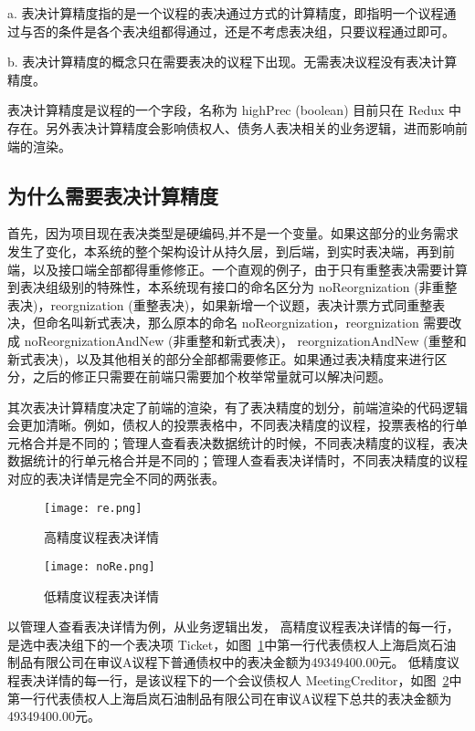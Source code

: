   \quad{}a. 表决计算精度指的是一个议程的表决通过方式的计算精度，即指明一个议程通过与否的条件是各个表决组都得通过，还是不考虑表决组，只要议程通过即可。


  \quad{}b. 表决计算精度的概念只在需要表决的议程下出现。无需表决议程没有表决计算精度。

  表决计算精度是议程的一个字段，名称为 highPrec (boolean) 目前只在 Redux 中存在。另外表决计算精度会影响债权人、债务人表决相关的业务逻辑，进而影响前端的渲染。

  \subsection{为什么需要表决计算精度}

  首先，因为项目现在表决类型是硬编码,并不是一个变量。如果这部分的业务需求发生了变化，本系统的整个架构设计从持久层，到后端，到实时表决端，再到前端，以及接口端全部都得重修修正。一个直观的例子，由于只有重整表决需要计算到表决组级别的特殊性，本系统现有接口的命名区分为 noReorgnization (非重整表决)，reorgnization (重整表决)，如果新增一个议题，表决计票方式同重整表决，但命名叫新式表决，那么原本的命名 noReorgnization，reorgnization 需要改成 noReorgnizationAndNew (非重整和新式表决)， reorgnizationAndNew (重整和新式表决)，以及其他相关的部分全部都需要修正。如果通过表决精度来进行区分，之后的修正只需要在前端只需要加个枚举常量就可以解决问题。

  其次表决计算精度决定了前端的渲染，有了表决精度的划分，前端渲染的代码逻辑会更加清晰。例如，债权人的投票表格中，不同表决精度的议程，投票表格的行单元格合并是不同的；管理人查看表决数据统计的时候，不同表决精度的议程，表决数据统计的行单元格合并是不同的；管理人查看表决详情时，不同表决精度的议程对应的表决详情是完全不同的两张表。
  \begin{figure}[!htp]
    \centering
    \texttt{[image: re.png]}
    \caption{高精度议程表决详情}
    \label{fig:reo}
  \end{figure}
  \begin{figure}[!htp]
    \centering
    \texttt{[image: noRe.png]}
    \caption{低精度议程表决详情}
    \label{fig:noReo}
  \end{figure}
  以管理人查看表决详情为例，从业务逻辑出发，
  高精度议程表决详情的每一行，是选中表决组下的一个表决项 Ticket，如图~\ref{fig:reo}中第一行代表债权人上海启岚石油制品有限公司在审议A议程下普通债权中的表决金额为49349400.00元。
  低精度议程表决详情的每一行，是该议程下的一个会议债权人 MeetingCreditor，如图~\ref{fig:noReo}中第一行代表债权人上海启岚石油制品有限公司在审议A议程下总共的表决金额为49349400.00元。

